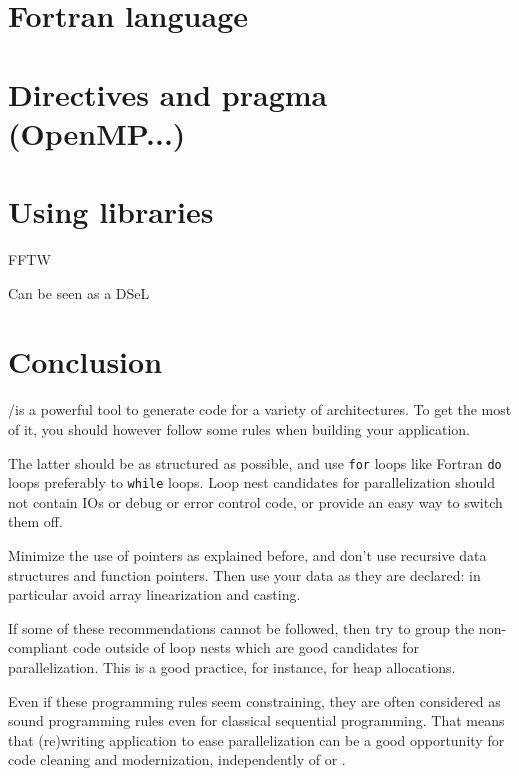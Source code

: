 \documentclass[a4paper]{article}
\begin{document}
\section{Fortran language}
\label{sec:fortran-language}


\section{Directives and pragma (OpenMP...)}
\label{sec:directives}


\section{Using libraries}
\label{sec:using-libraries}

FFTW

Can be seen as a DSeL


\section{Conclusion}
\label{sec:conclusion}

\Apips/\Apfa is a powerful tool to generate code for a variety
of architectures. To get the most of it, you should however follow
some rules when building your application.

The latter should be as structured as possible, and use
\lstinline{for} loops like Fortran \lstinline|do| loops preferably to
\lstinline{while} loops. Loop nest candidates for parallelization should
not contain IOs or debug or error control code, or provide an easy way
to switch them off.

Minimize the use of pointers as explained before, and don't use
recursive data structures and function pointers. Then use your data as they are
declared: in particular avoid array linearization and casting.

If some of these recommendations cannot be followed, then try to group
the non-compliant code outside of loop nests which are good
candidates for parallelization.  This is a good practice, for instance,
for heap allocations.

Even if these programming rules seem constraining, they are often
considered as sound programming rules even for classical sequential
programming. That means that (re)writing application to ease
parallelization can be a good opportunity for code cleaning and
modernization, independently of \Apips or \Apfa.


\end{document}
